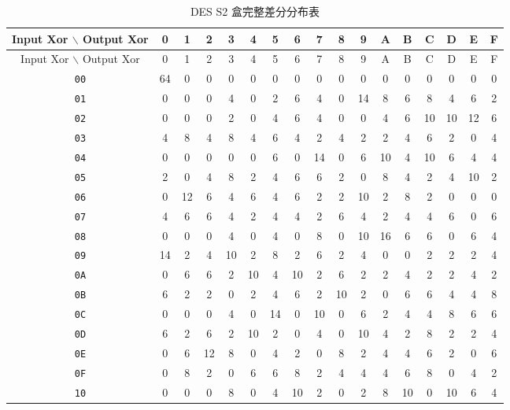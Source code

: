 \begin{center}
\begin{small}
\begin{longtable}{c|cccccccccccccccc}
\caption{DES S2 盒完整差分分布表} \\
\toprule
Input Xor $\backslash$ Output Xor & 0 & 1 & 2 & 3 & 4 & 5 & 6 & 7 & 8 & 9 & A & B & C & D & E & F \\ \midrule
\endfirsthead
\toprule
Input Xor $\backslash$ Output Xor  & 0 & 1 & 2 & 3 & 4 & 5 & 6 & 7 & 8 & 9 & A & B & C & D & E & F \\ \midrule
\endhead
\texttt{00} & 64 & 0 & 0 & 0 & 0 & 0 & 0 & 0 & 0 & 0 & 0 & 0 & 0 & 0 & 0 & 0 \\
\texttt{01} & 0 & 0 & 0 & 4 & 0 & 2 & 6 & 4 & 0 & 14 & 8 & 6 & 8 & 4 & 6 & 2 \\
\texttt{02} & 0 & 0 & 0 & 2 & 0 & 4 & 6 & 4 & 0 & 0 & 4 & 6 & 10 & 10 & 12 & 6 \\
\texttt{03} & 4 & 8 & 4 & 8 & 4 & 6 & 4 & 2 & 4 & 2 & 2 & 4 & 6 & 2 & 0 & 4 \\
\texttt{04} & 0 & 0 & 0 & 0 & 0 & 6 & 0 & 14 & 0 & 6 & 10 & 4 & 10 & 6 & 4 & 4 \\
\texttt{05} & 2 & 0 & 4 & 8 & 2 & 4 & 6 & 6 & 2 & 0 & 8 & 4 & 2 & 4 & 10 & 2 \\
\texttt{06} & 0 & 12 & 6 & 4 & 6 & 4 & 6 & 2 & 2 & 10 & 2 & 8 & 2 & 0 & 0 & 0 \\
\texttt{07} & 4 & 6 & 6 & 4 & 2 & 4 & 4 & 2 & 6 & 4 & 2 & 4 & 4 & 6 & 0 & 6 \\
\texttt{08} & 0 & 0 & 0 & 4 & 0 & 4 & 0 & 8 & 0 & 10 & 16 & 6 & 6 & 0 & 6 & 4 \\
\texttt{09} & 14 & 2 & 4 & 10 & 2 & 8 & 2 & 6 & 2 & 4 & 0 & 0 & 2 & 2 & 2 & 4 \\
\texttt{0A} & 0 & 6 & 6 & 2 & 10 & 4 & 10 & 2 & 6 & 2 & 2 & 4 & 2 & 2 & 4 & 2 \\
\texttt{0B} & 6 & 2 & 2 & 0 & 2 & 4 & 6 & 2 & 10 & 2 & 0 & 6 & 6 & 4 & 4 & 8 \\
\texttt{0C} & 0 & 0 & 0 & 4 & 0 & 14 & 0 & 10 & 0 & 6 & 2 & 4 & 4 & 8 & 6 & 6 \\
\texttt{0D} & 6 & 2 & 6 & 2 & 10 & 2 & 0 & 4 & 0 & 10 & 4 & 2 & 8 & 2 & 2 & 4 \\
\texttt{0E} & 0 & 6 & 12 & 8 & 0 & 4 & 2 & 0 & 8 & 2 & 4 & 4 & 6 & 2 & 0 & 6 \\
\texttt{0F} & 0 & 8 & 2 & 0 & 6 & 6 & 8 & 2 & 4 & 4 & 4 & 6 & 8 & 0 & 4 & 2 \\
\texttt{10} & 0 & 0 & 0 & 8 & 0 & 4 & 10 & 2 & 0 & 2 & 8 & 10 & 0 & 10 & 6 & 4 \\

\end{longtable}
\end{small}
\end{center}
